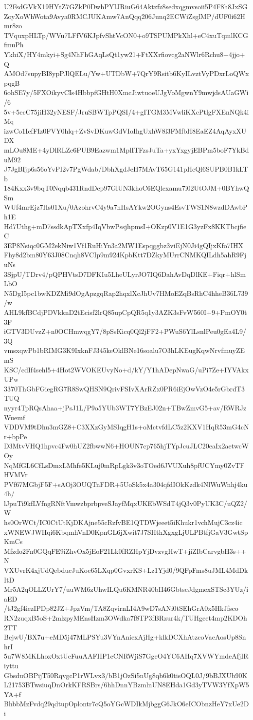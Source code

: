 U2FsdGVkX19HYtZ7GZkP0DwhPYIJRiuG64Aktzfz8sedxqgmvsoii5P4F8h8JxSG
ZoyXoWhWota9Avya0RMCJUKAmw7AnQqq206Junq2ECWiZsglMP/dUF0i62Hmr8zo
TVquxpHLTp/WVu7LFfV6KJpfvShtVcON0+o9TSPUMPkXhl+eC4xuTqmlKCGfmuPh
YkhiX/HY4mkyi+Sg4NhFhGAqLsQt1yw21+FtXXrfiovcg2aNWlr6Rchu8+4jjo+Q
AMOd7supyBI8ypPJlQELu/Yw+UTDbW+7QrY9Rsitb6KyILvztVyPDxrLoQWxpqgB
6ohSE7y/5FXOikyvCIs4HbbpfGHtH0XmcJiwtuoeUJgVoMgwnY9mwjdsAUaGWi/6
5v+5ecC75jiH32yNESF/JruSBWTpPQSI/4+gITGM3MVwliKXcPtlgFXEnNQk4iMq
izwCo1IefFIz0FVY0hlq+ZvSvDKuwGdVIoIhgUxhW8l3FMfbH8EaEZ4AqAyxXUDX
mLOu8ME+4yDlRLZe6PUB9Eazwm1MplITFzsJuTa+yxYxgyjEBPm5boF7YkBduM92
J7JgBIjp6s56oYvPI2v7PgWdab/DbhXgdJeH7MAvT65G141pHcQl6SUPB0B1kLTb
184Kxx3v9bqT0Nqqb431RndDep97GlUN3khoC6EQlcxamu7i02UtOJM+0BYhwQSm
WUf4mrEjz7Hs01Xu/0AzohrvC4y9a7nHsAYkw2OGyns4EsvTWS1N8wzdDAwbPh1E
Hd7Uthg+mD7ssdkApTXxfp4IqVbwPssjhpmsI+OKzp0V1E1G3yzFx8KKTbcjfieC
3EP8Nsiqc0GM2ekNiw1Vf1RuHiYn3a2MW1Espqggbz3viEjN0Ji4gQIjxKfo7IHX
Fhy8d2bm80Y63J08Cnqh8VCIp9m924KpbKtt7DZkyMUrrCNMKQILdh5ahR9FjuNs
3SjpU/TDrv4/pQPHVtsD7DFKIu5LheULyrJO7IQ6DahAvDqDlKE+Fiqr+hlSmLbO
N5DgI5pc1bwKDZMi9dOgApzgqRap2hqxlXcJhUv7HMoEZqBsRhC4hheB36L739/w
AHL9kfBCdjPDVkknD2tEcisf2lrQ85upCpQR5q1y3AZK3sFvW560I+9+PmOY0t3F
iGTV3DUvzZ+n0OCHmwqgY7/8pSsKicq0Ql2jFF2+PWuS6YlLsnlPeu0gEa4L9/3Q
vmsxqwPb1bRIMG3K9IxknFJ345keOklBNe16soalu7O3hLKEugKqwNrvfmuyZEmS
KSC/cdIf4sehl5+4Hot2WVOKEUvyNo+d/kY/Y1hADepNwaG/uPi7Ze+IYVAkxUPw
3370ThGbFGiegRG7R8SwQHSN9QrivFSIvXArRZx0PR6iEjOwVzO4e5rGbrdT3TUQ
nyyr4TpRQsAhaa+jPsJ1L/P9o5YUb3WT7YBzEJ02n+TBwZmvG5+av/RWRJzWuemf
VDDVM9tDhu3mGZ8+C3XXzGyMSIqgH1s+oMctvfdLC5z2KXV1HqR53mG4cNr+bpPe
D3MtvVHQ1hpvc4Fw0hUZ2fbwwN6+HOUN7cp765hjTYpJcuJLC20eaIx2aetwcWOy
NqMfGL6CfLsDmxLMhfe5KLuj0mRpLgk3v3oTOed6JVUXuh8pfUCYmy0ZvTFHVMVr
PVf67MGbjF5F+sAOj3OUQTnFDR+5UoSk5x4a304qfdIOkKzdk4NlWuWnhj4ku4h/
lJpuTi9kfLVfngRNftVmwzbprbpveSJayfMqxUKEbWSdT4jQ3v0PyUK3C/uQZ2/W
hs0OrWCt/IC0CtUtKjDKAjne55cRzfvBE1QTDWjeeet5iKhukr1vchMujC3cz4ic
xWNEWJWHqi6KbqmhVnD0KpnGL6jXwit7J7SHthXgxgLjULPBtfjGaV3GwtSpKmCs
Mfzdo2Fn0GQqFE9iZhvOx5jEoF21Lk0fRZHpYjDvzvgHwT+jiZIbCarvgbH3s++N
VXUvrK4xjUdQebducJuKoe65LXqp0GvxrKS+Lz1Yjd0/9QFpFms8uJML4MdDkItD
Mr5A2qOLLZUrY7/uuWM6zUhwILQu6KMNR40bII46GbtscJdgmexSTSc3YUz/iaED
/tJ2gf4iezIPDp82JZ+JpzVm/TA8ZqvirnLI4A9wD7sANi0tSEhGrA0x5HkJfsco
RN2zuqxB5oS+2mlzpyMEnsHzm3OWdka7f8TP3fBRzur4k/TUHgeet4mp2KDOh2TT
BejwU/BX7u+eMD5j47MLPSYu3VYnAniexAjHg+klkDCXhAtzcoVaeAosUp8SnhrI
5u7W8MKLhoxOxtUeFuuAAFIIP1cCNRWjiS7GgeO4YC6AHq7XVWYmdeAfjIRiyttu
GbsduOBPijT50RqvgcP1rWLvx3/bB1jOzSi5nUg8qb6k0tisOQL0J/9bBJXUb90K
L21753BTwsiuqDnOrkKFRSBrs/6hhDnnYBzmlnUN8EHda1Gd3yTVW3YfXpW5YA+f
BhbbMzFvdq29qdtupOplontr7cQ5oYGcWDIkMjbggG6JkO6eICObnzHeY7xUe2Di
